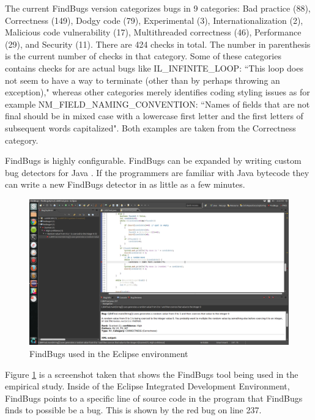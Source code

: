 The current FindBugs version categorizes bugs in 9 categories: Bad practice (88), Correctness (149), Dodgy code (79), Experimental (3), Internationalization (2), Malicious code vulnerability (17), Multithreaded correctness (46), Performance (29), and Security (11). There are 424 checks in total. The number in parenthesis is the current number of checks in that category. Some of these categories contains checks for are actual bugs like IL\_INFINITE\_LOOP: ``This loop does not seem to have a way to terminate (other than by perhaps throwing an exception)," whereas other categories merely identifies coding styling issues as for example NM\_FIELD\_NAMING\_CONVENTION: ``Names of fields that are not final should be in mixed case with a lowercase first letter and the first letters of subsequent words capitalized". Both examples are taken from the Correctness category.

FindBugs is highly configurable. FindBugs can be expanded by writing custom bug detectors for Java \cite{bugFindingTools}. If the programmers are familiar with Java bytecode they can write a new FindBugs detector in as little as a few minutes.


\begin{figure}[h]
\begin{center}
	\includegraphics[width=1.15\textwidth]{FindBugs.png}
\end{center}
\caption{FindBugs used in the Eclipse environment}
\label{fig:findbugs}
\end{figure}

Figure \ref{fig:findbugs} is a screenshot taken that shows the FindBugs tool being used in the empirical study. Inside of the Eclipse Integrated Development Environment, FindBugs points to a specific line of source code in the program that FindBugs finds to possible be a bug. This is shown by the red bug on line 237.
